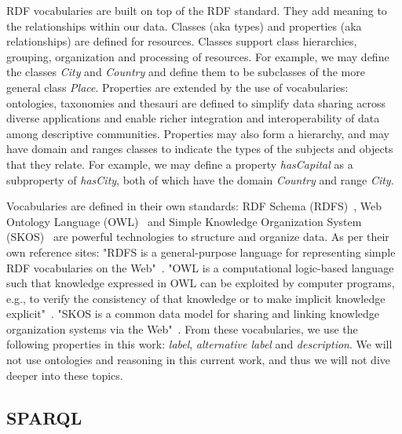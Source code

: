 RDF vocabularies are built on top of the RDF standard. They add meaning to the relationships within our data. Classes (aka types) and properties (aka relationships) are defined for resources. Classes support class hierarchies, grouping, organization and processing of resources. For example, we may define the classes \textit{City} and \textit{Country} and define them to be subclasses of the more general class \textit{Place}. Properties are extended by the use of vocabularies: ontologies, taxonomies and thesauri are defined to simplify data sharing across diverse applications and enable richer integration and interoperability of data among descriptive communities. Properties may also form a hierarchy, and may have domain and ranges classes to indicate the types of the subjects and objects that they relate. For example, we may define a property \textit{hasCapital} as a subproperty of \textit{hasCity}, both of which have the domain \textit{Country} and range \textit{City}.

Vocabularies are defined in their own standards: RDF Schema (RDFS)~\cite{RDFS}, Web Ontology Language (OWL)~\cite{OWL} and Simple Knowledge Organization System (SKOS)~\cite{SKOS} are powerful technologies to structure and organize data. As per their own reference sites: "RDFS is a general-purpose language for representing simple RDF vocabularies on the Web"~\cite{RDFS}. "OWL is a computational logic-based language such that knowledge expressed in OWL can be exploited by computer programs, e.g., to verify the consistency of that knowledge or to make implicit knowledge explicit"~\cite{OWL}. "SKOS is a common data model for sharing and linking knowledge organization systems via the Web"~\cite{SKOS}. From these vocabularies, we use the following properties in this work: \textit{label}, \textit{alternative label} and \textit{description}. We will not use ontologies and reasoning in this current work, and thus we will not dive deeper into these topics.


\subsection{SPARQL}
\label{chap:SPARQL}


